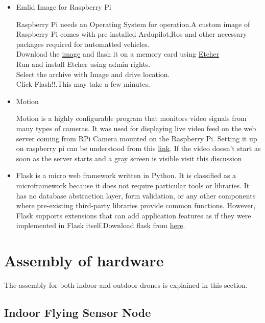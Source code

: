 \documentclass[a4paper,12pt,oneside]{book}
\begin{document}
\begin{itemize}
  \item Emlid Image for Raspberry Pi
  
  Raspberry Pi needs an Operating System for operation.A custom image of Raspberry Pi comes with pre installed Ardupilot,Ros and other necessary packages required for automatted vehicles.\\Download the \href{http://files.emlid.com/images/emlid-raspbian-20180525.img.xz}{image} and flash it on a memory card using \href{https://etcher.io/}{Etcher}
  \\
  Run and install Etcher using admin rights.\\Select the archive with Image and drive location.\\Click Flash!!.This may take a few minutes.
  
  \item Motion
  
  Motion is a highly configurable program that monitors video signals from many types of cameras. It was used for displaying live video feed on the web server coming from RPi Camera mounted on the Raspberry Pi. Setting it up  on raspberry pi can be understood from this \href{https://pimylifeup.com/raspberry-pi-webcam-server/}{link}. If the video doesn't start as soon as the server starts and a gray screen is visible visit this \href{https://raspberrypi.stackexchange.com/questions/60669/unable-to-open-video-device
}{discussion}
  
 
  \item Flask is a micro web framework written in Python. It is classified as a microframework because it does not require particular tools or libraries. It has no database abstraction layer, form validation, or any other components where pre-existing third-party libraries provide common functions. However, Flask supports extensions that can add application features as if they were implemented in Flask itself.Download flask from \href{http://flask.pocoo.org/docs/0.12/installation/}{here}.
  
\end{itemize}

\section{Assembly of hardware}
The assembly for both indoor and outdoor drones is explained in this section. 

\subsection*{Indoor Flying Sensor Node} 
\end{document}
